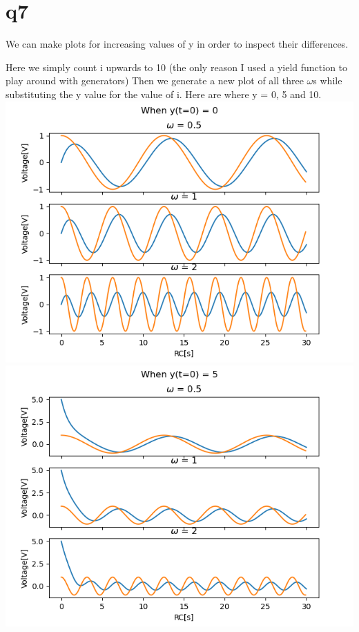 \documentclass[a4paper,english]{article}
\begin{document}
    \section{q7}
        We can make plots for increasing values of y in order to inspect their differences.
        
        Here we simply count i upwards to 10 (the only reason I used a yield function to play around with generators)
        Then we generate a new plot of all three $\omega$s while substituting the y value for the value of i.
        Here are where y = 0, 5 and 10.
        \includegraphics[scale=0.74]{q6_6_t0.png}\\
        \includegraphics[scale=0.74]{q6_6_t5.png}\\
\end{document}
